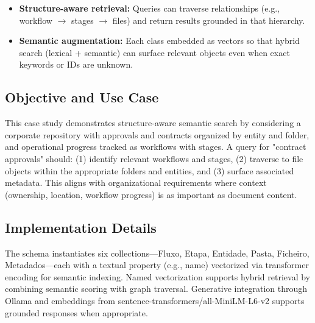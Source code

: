 \begin{itemize}
    \item \textbf{Structure-aware retrieval:} Queries can traverse relationships (e.g., workflow \(\rightarrow\) stages \(\rightarrow\) files) and return results grounded in that hierarchy.
    \item \textbf{Semantic augmentation:} Each class embedded as vectors so that hybrid search (lexical + semantic) can surface relevant objects even when exact keywords or IDs are unknown.
\end{itemize}

\subsection{Objective and Use Case}

This case study demonstrates structure-aware semantic search by considering a corporate repository with approvals and contracts organized by entity and folder, and operational progress tracked as workflows with stages. A query for "contract approvals" should: (1) identify relevant workflows and stages, (2) traverse to file objects within the appropriate folders and entities, and (3) surface associated metadata. This aligns with organizational requirements where context (ownership, location, workflow progress) is as important as document content.

\subsection{Implementation Details}

The schema instantiates six collections—Fluxo, Etapa, Entidade, Pasta, Ficheiro, Metadados—each with a textual property (e.g., name) vectorized via transformer encoding for semantic indexing. Named vectorization supports hybrid retrieval by combining semantic scoring with graph traversal. Generative integration through Ollama and embeddings from sentence-transformers/all-MiniLM-L6-v2 supports grounded responses when appropriate.


